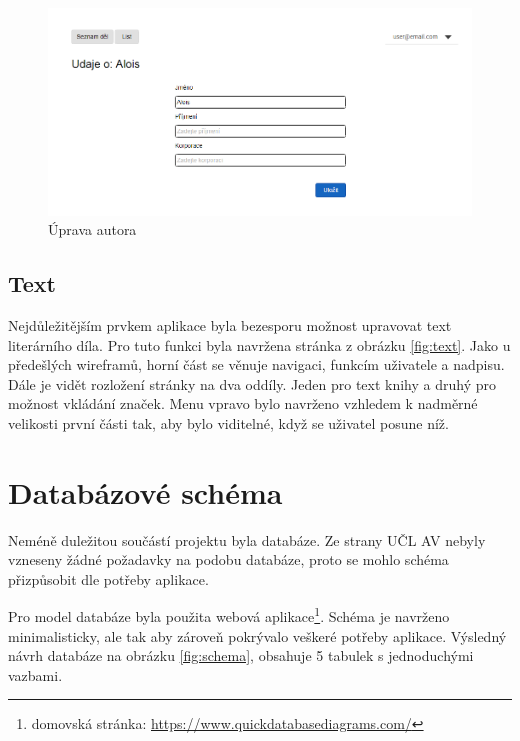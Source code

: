             \begin {figure}[H]\centering
                \includegraphics[width=\textwidth]{images/edit}
                \caption {Úprava autora}
                \label {fig:edit}
            \end{figure}
            
        \subsection{Text}
            Nejdůležitějším prvkem aplikace byla bezesporu možnost upravovat text literárního díla. Pro tuto funkci byla navržena stránka z obrázku \ref{fig:text}. Jako u předešlých wireframů, horní část se věnuje navigaci, funkcím uživatele a nadpisu. Dále je vidět rozložení stránky na dva oddíly. Jeden pro text knihy a druhý pro možnost vkládání značek. Menu vpravo bylo navrženo vzhledem k nadměrné velikosti první části tak, aby bylo viditelné, když se uživatel posune níž.
            
    \section{Databázové schéma}
        Neméně duležitou součástí projektu byla databáze. Ze strany UČL AV nebyly vzneseny žádné požadavky na podobu databáze, proto se mohlo schéma přizpůsobit dle potřeby aplikace.
        
        Pro model databáze byla použita webová aplikace\footnote{domovská stránka: \url{https://www.quickdatabasediagrams.com/}}. Schéma je navrženo minimalisticky, ale tak aby zároveň pokrývalo veškeré potřeby aplikace. Výsledný návrh databáze na obrázku \ref{fig:schema}, obsahuje 5 tabulek s jednoduchými vazbami.
        
